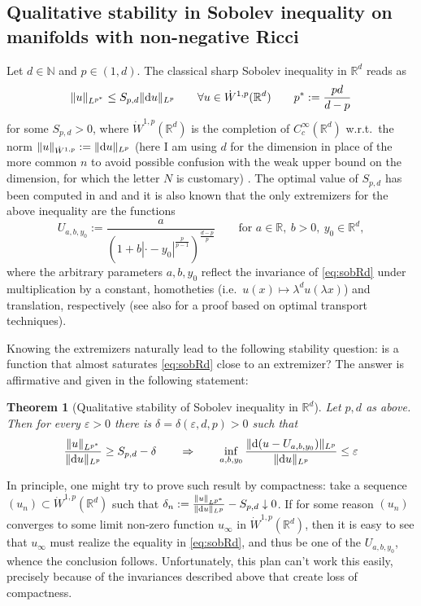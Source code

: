 \documentclass[11pt]{article}
\numberwithin{equation}{section}
\newtheorem{theorem}{Theorem}[section]
\newcommand{\N}{\mathbb{N}}
\newcommand{\R}{\mathbb{R}}
\renewcommand{\d}{{\rm d}}
\newcommand{\eps}{\varepsilon}
\begin{document}
\subsection{Qualitative stability in Sobolev inequality on manifolds with non-negative Ricci}

Let $d\in \N$ and $p\in(1,d)$. The classical sharp Sobolev inequality in $\R^d$ reads as
\begin{equation}
\label{eq:sobRd}
\|u\|_{L^{p^*}}\leq S_{p,d}\|\d u\|_{L^p}\qquad\forall u\in \dot W^{1,p}(\R^d)\qquad p^*:=\frac{pd}{d-p}
\end{equation}
for some $S_{p,d}>0$, where $\dot W^{1,p}(\R^d)$ is the completion of $C^\infty_c(\R^d)$ w.r.t.\ the norm $\|u\|_{\dot W^{1,p}}:=\|\d u\|_{L^p}$ (here I am using $d$ for the dimension in place of the more common $n$ to avoid possible confusion with the weak upper bound on the dimension, for which the letter $N$ is customary) . The optimal value of $S_{p,d}$ has been computed in \cite{Aubin76-2} and \cite{Talenti76} and it is also known that the only extremizers for the above inequality are the functions
\begin{equation}
\label{eq:extremsob}
U_{a,b,y_0}:=\frac{a}{(1+b|\cdot-y_0|^{\frac p{p-1}})^{\frac{d-p}{p}}}\qquad\text{for } a\in\R,\ b>0,\ y_0\in\R^d,
\end{equation}
where the arbitrary parameters $a,b,y_0$ reflect the invariance of \eqref{eq:sobRd} under multiplication by a constant, homotheties (i.e.\ $u(x)\mapsto \lambda^{d}u(\lambda x)$) and translation, respectively (see also \cite{CENaVi04} for a proof based on optimal transport techniques).

Knowing the extremizers naturally lead to the following stability question: is a function that almost saturates \eqref{eq:sobRd} close to an extremizer? The answer is affirmative and given in the following statement:
\begin{theorem}[Qualitative stability of Sobolev inequality in $\R^d$]\label{thm:stabsobrd}
Let $p,d$ as above. Then for every $\eps>0$ there is $\delta=\delta(\eps,d,p)>0$ such that
\[
\frac{\|u\|_{L^{p^*}}}{\|\d u\|_{L^p}}\geq S_{p,d}-\delta\qquad\Rightarrow\qquad \inf_{a,b,y_0}\frac{\|\d(u-U_{a,b,y_0})\|_{L^p}}{\|\d u\|_{L^p}}\leq\eps
\]
\end{theorem}
In principle, one might try to prove such result by compactness: take a sequence $(u_n)\subset  \dot W^{1,p}(\R^d)$ such that $\delta_n:=\frac{\|u\|_{L^{p^*}}}{\|\d u\|_{L^p}}-S_{p,d}\downarrow0$. If for some reason $(u_n)$ converges to some limit non-zero function $u_\infty$  in $\dot W^{1,p}(\R^d)$, then it is easy to see that $u_\infty$ must realize the equality in \eqref{eq:sobRd}, and thus be one of the $U_{a,b,y_0}$, whence the conclusion follows. Unfortunately, this plan can't work this easily, precisely because of the invariances described above that create loss of compactness. 
\end{document}
